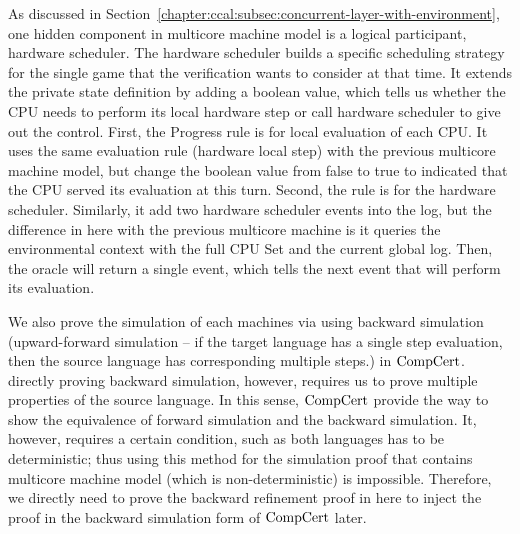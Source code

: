 As discussed in Section~\ref{chapter:ccal:subsec:concurrent-layer-with-environment}, 
one hidden component in multicore machine model is a logical participant, hardware scheduler. 
The hardware scheduler builds a specific scheduling strategy for the single game that the 
verification wants to consider at that time.  
It extends the private state definition by adding a boolean value, which tells us 
whether the CPU needs to perform its local hardware step or call hardware scheduler to give out the control. 
First, the \textsf{Progress} rule is for local evaluation of each CPU. It uses 
the same evaluation rule (hardware local step) with the previous multicore machine model, 
but change the boolean value from false to true to indicated that the CPU served its evaluation at this turn. 
Second, the  rule is for the hardware scheduler.
Similarly, it add two hardware scheduler events into the log, but the difference in here with the previous multicore machine is 
it queries the environmental context with the full CPU Set and the current global log. 
Then, the oracle will return a single event, which tells the next event that will perform its evaluation. 


We also prove the simulation of each machines via using backward simulation (upward-forward simulation -- if the target language
has a single step evaluation, then the source language has corresponding multiple steps.) 
in $\mathrm{CompCert}$. 
directly proving backward simulation, however, requires us to prove multiple properties of the source language. 
In this sense, $\mathrm{CompCert}$ provide the way to show the equivalence of forward simulation and the backward simulation. 
It, however, requires a certain condition, such as both languages has to be deterministic;
thus using this method for the simulation proof that contains multicore machine model (which is non-deterministic) 
is impossible. 
Therefore, we directly need to prove the backward refinement proof in here to inject the proof in the backward simulation form of $\mathrm{CompCert}$ later. 

